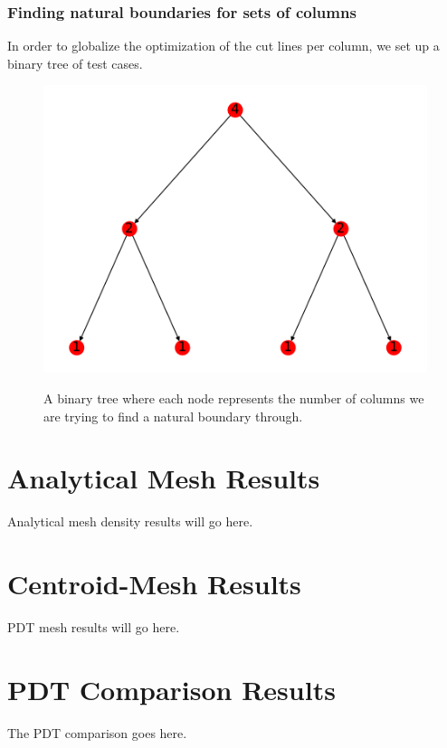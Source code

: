 \FloatBarrier
\subsubsection{Finding natural boundaries for sets of columns}
In order to globalize the optimization of the cut lines per column, we set up a binary tree of test cases. 

\begin{figure}[h]
\centering
\includegraphics[scale=0.75]{../figures/binary_tree.pdf}
\label{binary_tree}
\caption{A binary tree where each node represents the number of columns we are trying to find a natural boundary through.}
\end{figure}



\FloatBarrier
\section{Analytical Mesh Results}
Analytical mesh density results will go here.

\section{Centroid-Mesh Results}

PDT mesh results will go here.

\section{PDT Comparison Results}

The PDT comparison goes here.

